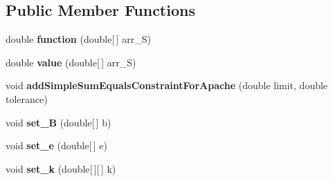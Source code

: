 \subsection*{Public Member Functions}
\begin{DoxyCompactItemize}
\item 
\hypertarget{classuk_1_1ac_1_1dmu_1_1iesd_1_1cascade_1_1util_1_1_minimisation_function_objective_overnight_wind_a382012b138cc7b0dec84084c5fe2f672}{double {\bfseries function} (double\mbox{[}$\,$\mbox{]} arr\-\_\-\-S)}\label{classuk_1_1ac_1_1dmu_1_1iesd_1_1cascade_1_1util_1_1_minimisation_function_objective_overnight_wind_a382012b138cc7b0dec84084c5fe2f672}

\item 
\hypertarget{classuk_1_1ac_1_1dmu_1_1iesd_1_1cascade_1_1util_1_1_minimisation_function_objective_overnight_wind_a677c121efd3085b31d171d8ae62c619c}{double {\bfseries value} (double\mbox{[}$\,$\mbox{]} arr\-\_\-\-S)}\label{classuk_1_1ac_1_1dmu_1_1iesd_1_1cascade_1_1util_1_1_minimisation_function_objective_overnight_wind_a677c121efd3085b31d171d8ae62c619c}

\item 
\hypertarget{classuk_1_1ac_1_1dmu_1_1iesd_1_1cascade_1_1util_1_1_minimisation_function_objective_overnight_wind_a6b55e114e468e5569a6d6bfb47905a63}{void {\bfseries add\-Simple\-Sum\-Equals\-Constraint\-For\-Apache} (double limit, double tolerance)}\label{classuk_1_1ac_1_1dmu_1_1iesd_1_1cascade_1_1util_1_1_minimisation_function_objective_overnight_wind_a6b55e114e468e5569a6d6bfb47905a63}

\item 
\hypertarget{classuk_1_1ac_1_1dmu_1_1iesd_1_1cascade_1_1util_1_1_minimisation_function_objective_overnight_wind_a8e4c70fed6b3c004472042e2b6f13c40}{void {\bfseries set\-\_\-\-B} (double\mbox{[}$\,$\mbox{]} b)}\label{classuk_1_1ac_1_1dmu_1_1iesd_1_1cascade_1_1util_1_1_minimisation_function_objective_overnight_wind_a8e4c70fed6b3c004472042e2b6f13c40}

\item 
\hypertarget{classuk_1_1ac_1_1dmu_1_1iesd_1_1cascade_1_1util_1_1_minimisation_function_objective_overnight_wind_afd58f7b552a7fd0c5586a608414929d6}{void {\bfseries set\-\_\-e} (double\mbox{[}$\,$\mbox{]} e)}\label{classuk_1_1ac_1_1dmu_1_1iesd_1_1cascade_1_1util_1_1_minimisation_function_objective_overnight_wind_afd58f7b552a7fd0c5586a608414929d6}

\item 
\hypertarget{classuk_1_1ac_1_1dmu_1_1iesd_1_1cascade_1_1util_1_1_minimisation_function_objective_overnight_wind_afd959746b8181487f05392813acae77a}{void {\bfseries set\-\_\-k} (double\mbox{[}$\,$\mbox{]}\mbox{[}$\,$\mbox{]} k)}\label{classuk_1_1ac_1_1dmu_1_1iesd_1_1cascade_1_1util_1_1_minimisation_function_objective_overnight_wind_afd959746b8181487f05392813acae77a}


\end{DoxyCompactItemize}
